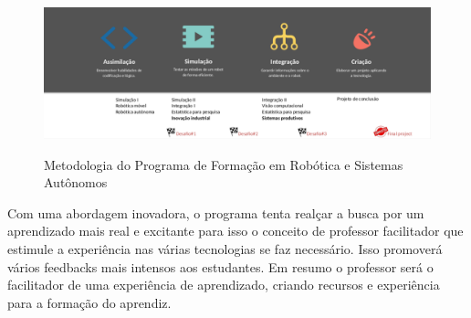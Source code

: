 \begin{figure}[H]
    \caption{Metodologia do Programa de Formação em Robótica e Sistemas Autônomos}
    \centering
    \includegraphics[width= \textwidth]{Figures/metodologia.png}
    \label{fig:metodologia}
\end{figure}

Com uma abordagem inovadora, o programa tenta realçar a busca por um aprendizado mais real e excitante para isso o conceito de professor facilitador que estimule a experiência nas várias tecnologias se faz necessário. Isso promoverá vários feedbacks mais intensos aos estudantes. Em resumo o professor será o facilitador de uma experiência de aprendizado, criando recursos e experiência para a formação do aprendiz.




